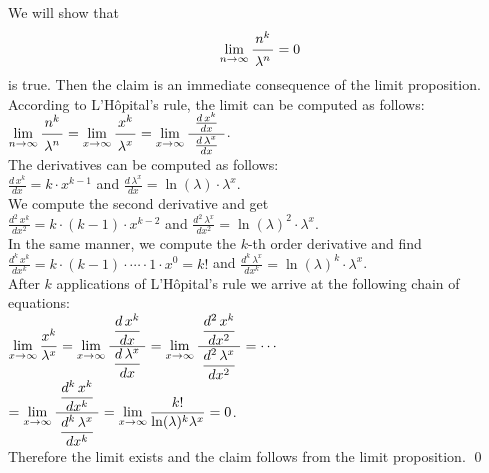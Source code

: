 \proof  We will show that 
\hspace*{1.3cm} 
\begin{equation}
  \label{eq:star}
  \lim\limits_{n \rightarrow \infty} \bruch{n^{k}}{\lambda^n} = 0  
\end{equation}
is true.  Then the claim is an immediate consequence of the limit proposition. 
According to L'H\^opital's rule,  
the limit can be computed as follows: \\[0.2cm]
\hspace*{1.3cm} 
$\displaystyle \lim\limits_{n \rightarrow \infty} \bruch{n^{k}}{\lambda^n} =
\lim\limits_{x \rightarrow \infty} \bruch{x^{k}}{\lambda^x} =
\lim\limits_{x \rightarrow \infty} \bruch{\;\frac{d\,x^{k}}{dx}\;}{\frac{d\,\lambda^x}{dx}}$.
\\[0.2cm]
The derivatives can be computed as follows: \\[0.2cm]
\hspace*{1.3cm}
 $\displaystyle \frac{d\,x^{k}}{dx} = k \cdot x^{k-1}$ \quad and \quad 
 $\displaystyle \frac{d\,\lambda^{x}}{dx} = \ln(\lambda) \cdot \lambda^x$. \\[0.2cm]
We compute the second derivative and get \\[0.2cm]
\hspace*{1.3cm}  
$\displaystyle \frac{d^{2}\,x^{k}}{dx^2} = k \cdot (k-1) \cdot x^{k-2}$ \quad and \quad 
 $\displaystyle \frac{d^2\,\lambda^{x}}{dx^2} = \ln(\lambda)^2 \cdot \lambda^x$. \\[0.2cm]
In the same manner, we compute the $k$-th order derivative and find \\[0.2cm]
\hspace*{1.3cm} 
$\displaystyle \frac{d^{k}\,x^{k}}{dx^k} = k \cdot (k-1) \cdot \cdots \cdot 1 \cdot x^{0} = k!$ \quad and \quad 
 $\displaystyle \frac{d^k\,\lambda^{x}}{dx^k} = \ln(\lambda)^k \cdot \lambda^x$. \\[0.2cm]
After $k$ applications of L'H\^opital's rule we arrive at the following chain of equations:
\\[0.2cm]
\hspace*{1.3cm} 
$\displaystyle 
\lim\limits_{x \rightarrow \infty} \frac{x^{k}}{\lambda^x} =
\lim\limits_{x \rightarrow \infty} \frac{\displaystyle\;\frac{d\,x^{k}}{dx}\;}{\displaystyle\frac{d\,\lambda^x}{dx}} =
\lim\limits_{x \rightarrow \infty} \frac{\displaystyle\;\frac{d^2\,x^{k}}{dx^2}\;}{\displaystyle\frac{d^2\,\lambda^x}{dx^2}} =
\cdots$
\\[0.3cm]
\hspace*{2.8cm}
$\displaystyle = 
\lim\limits_{x \rightarrow \infty} \frac{\displaystyle\;\frac{d^k\,x^{k}}{dx^k}\;}{\displaystyle\frac{d^k\,\lambda^x}{dx^k}} =
\lim\limits_{x \rightarrow \infty} \frac{k!}{\ln(\lambda)^k \lambda^x} = 0$.
\\[0.2cm] 
Therefore the limit exists and the claim follows from the limit proposition.
\qed

